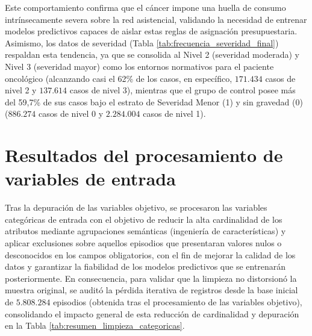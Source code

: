 Este comportamiento confirma que el cáncer impone una huella de consumo intrínsecamente severa sobre la red asistencial, validando la necesidad de entrenar modelos predictivos capaces de aislar estas reglas de asignación presupuestaria. Asimismo, los datos de severidad (Tabla \ref{tab:frecuencia_severidad_final}) respaldan esta tendencia, ya que se consolida al Nivel 2 (severidad moderada) y Nivel 3 (severidad mayor) como los entornos normativos para el paciente oncológico (alcanzando casi el 62\% de los casos, en específico, $171.434$ casos de nivel 2 y $137.614$ casos de nivel 3), mientras que el grupo de control posee más del 59,7\% de sus casos bajo el estrato de Severidad Menor (1) y sin gravedad (0) ($886.274$ casos de nivel 0 y $2.284.004$ casos de nivel 1).

\section{Resultados del procesamiento de variables de entrada}
\label{sec:resultados_categoricas}

Tras la depuración de las variables objetivo, se procesaron las variables categóricas de entrada con el objetivo de reducir la alta cardinalidad de los atributos mediante agrupaciones semánticas (ingeniería de características) y aplicar exclusiones sobre aquellos episodios que presentaran valores nulos o desconocidos en los campos obligatorios, con el fin de mejorar la calidad de los datos y garantizar la fiabilidad de los modelos predictivos que se entrenarán posteriormente. En consecuencia, para validar que la limpieza no distorsionó la muestra original, se auditó la pérdida iterativa de registros desde la base inicial de $5.808.284$ episodios (obtenida tras el procesamiento de las variables objetivo), consolidando el impacto general de esta reducción de cardinalidad y depuración en la Tabla \ref{tab:resumen_limpieza_categoricas}.



